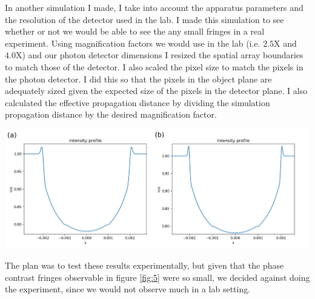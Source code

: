 \documentclass[9pt, a4paper]{article}
\newenvironment{Figure}
    {\par\medskip\noindent\minipage{\linewidth}}
    {\endminipage\par\medskip}
\begin{document}
In another simulation I made, I take into account the apparatus parameters and the resolution of the detector used in the lab. I made this simulation to see whether or not we would be able to see the any small fringes in a real experiment. Using magnification factors we would use in the lab (i.e. $2.5$X and $4.0$X) and our photon detector dimensions I resized the spatial array boundaries to match those of the detector. I also scaled the pixel size to match the pixels in the photon detector. I did this so that the pixels in the object plane are adequately sized given the expected size of the pixels in the detector plane. I also calculated the effective propagation distance by dividing the simulation propagation distance by the desired magnification factor.
\begin{Figure}\label{fig:5}
\centering
\includegraphics[width=\linewidth]{LAB_ice_water_AS_2_magnifications.pdf}
\end{Figure}
The plan was to test these results experimentally, but given that the phase contrast fringes observable in figure \ref{fig:5} were so small, we decided against doing the experiment, since we would not observe much in a lab setting. 
\end{document}
